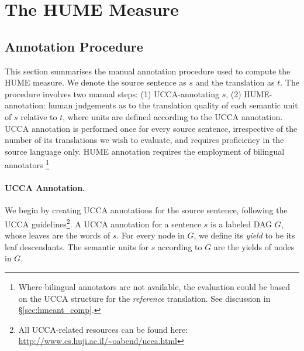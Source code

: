 \documentclass[11pt,letterpaper]{article}
\newcommand{\secref}[1]{\S\ref{#1}}
\def\perscite#1{\newcite{#1}}
\def\parcite#1{\cite{#1}}
\begin{document}





\section{The HUME Measure}\label{sec:hume}

\subsection{Annotation Procedure}\label{sec:guidelines}

This section summarises the manual annotation procedure used
to compute the HUME measure. 
We denote the source sentence as $s$ and the translation as $t$. 
The procedure involves two manual steps: (1) UCCA-annotating $s$, 
(2) HUME-annotation: human judgements as to the translation quality of each semantic
unit of $s$ relative to $t$,
where units are defined according to the UCCA annotation.
UCCA annotation is performed once for every source sentence,
irrespective of the number of its translations we wish to evaluate,
and requires proficiency in the source language only.
HUME annotation requires the employment of bilingual annotators
\footnote{Where bilingual annotators are not available,
  the evaluation could be based on the UCCA structure for the
  \emph{reference} translation. See discussion in \secref{sec:hmeant_comp}.}


\paragraph{UCCA Annotation.}
We begin by creating UCCA annotations for the source sentence, following the
UCCA guidelines\footnote{All UCCA-related resources can be found
  here: \url{http://www.cs.huji.ac.il/~oabend/ucca.html}}.
A UCCA annotation for a sentence $s$ is a labeled DAG $G$, whose leaves
are the words of $s$.
For every node in $G$, we define its {\it yield} to be its leaf descendants.
The semantic units for $s$ according to $G$ are the yields of nodes in $G$. 
\end{document}
